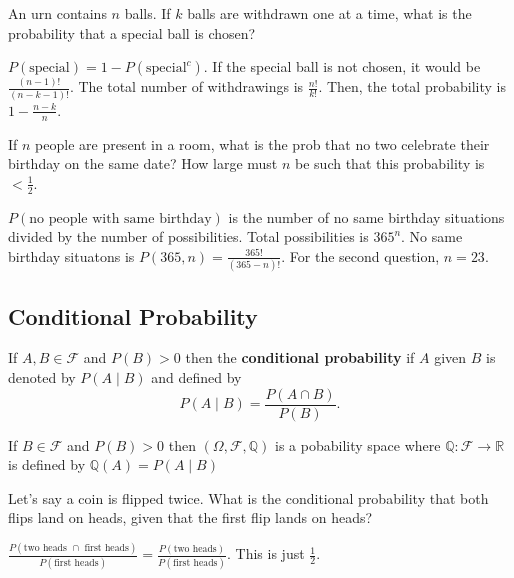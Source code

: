 \begin{eg}
	An urn contains \( n \) balls. If \( k \) balls are withdrawn one at a time, what is the probability that a special ball is chosen?
\end{eg}
\begin{explanation}
	\( P(\text{special})  = 1 - P(\text{special}^{c})\). If the special ball is not chosen, it would be \( \frac{(n-1)!}{(n-k-1)!} \). The total number of withdrawings is \( \frac{n!}{k!} \). Then, the total probability is \( 1-\frac{n-k}{n} \).
\end{explanation}

\begin{eg}
	If \( n \) people are present in a room, what is the prob that no two celebrate their birthday on the same date? How large must \( n \) be such that this probability is \( <\frac{1}{2} \).
\end{eg}
\begin{explanation}
	\( P(\text{no people with same birthday}) \) is the number of no same birthday situations divided by the number of possibilities. Total possibilities is \( 365^n \). No same birthday situatons is \( P(365,n) = \frac{365!}{(365-n)!} \). For the second question, \( n=23 \).
\end{explanation}

\subsection{Conditional Probability}

\begin{definition}
	If \( A,B \in \mathcal{F} \) and \( P(B) > 0 \) then the \textbf{conditional probability} if \( A \) given \( B \) is denoted by \( P(A\mid B) \) and defined by \[
		P(A \mid B) = \frac{P(A \cap B)}{P(B)}
	.\] 
\end{definition}

\begin{theorem}
	If \( B \in \mathcal{F} \) and \( P(B) > 0 \) then \( (\Omega, \mathcal{F}, \mathbb{Q}) \) is a pobability space where \( \mathbb{Q}: \mathcal{F} \to \mathbb{R} \) is defined by \( \mathbb{Q}(A) = P(A \mid B) \)
\end{theorem}

\begin{eg}
	Let's say a coin is flipped twice. What is the conditional probability that both flips land on heads, given that the first flip lands on heads?
\end{eg}
\begin{explanation}
	\( \frac{P(\text{two heads } \cap \text{ first heads})}{P(\text{first heads})} = \frac{P(\text{two heads})}{P(\text{first heads})}\). This is just \( \frac{1}{2} \).
\end{explanation}

